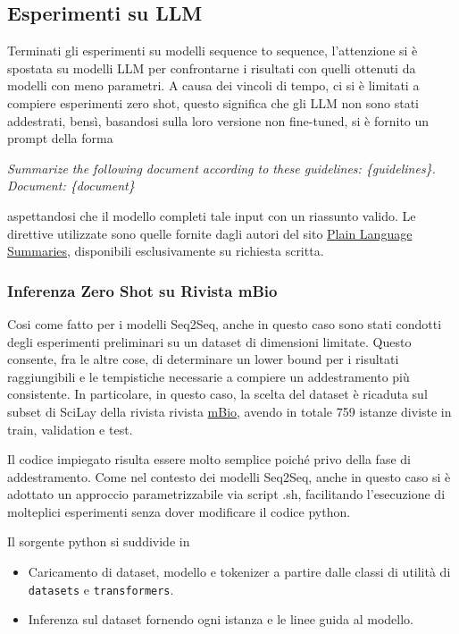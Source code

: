 \documentclass[12pt,a4paper,twoside,openright]{book}
\begin{document}
\subsection{Esperimenti su LLM}
Terminati gli esperimenti su modelli sequence to sequence, l'attenzione si è spostata su modelli LLM per confrontarne i risultati con quelli ottenuti da modelli con meno parametri. A causa dei vincoli di tempo, ci si è limitati a compiere esperimenti zero shot, questo significa che gli LLM non sono stati addestrati, bensì, basandosi sulla loro versione non fine-tuned, si è fornito un prompt della forma 
\begin{center}
    \emph{Summarize the following document according to these guidelines: \{guidelines\}. Document: \{document\}}
\end{center}
aspettandosi che il modello completi tale input con un riassunto valido. 
Le direttive utilizzate sono quelle fornite dagli autori del sito \href{https://www.plainlanguagesummaries.com/}{Plain Language Summaries}, disponibili esclusivamente su richiesta scritta.

\subsubsection{Inferenza Zero Shot su Rivista mBio}
Cosi come fatto per i modelli Seq2Seq, anche in questo caso sono stati condotti degli esperimenti preliminari su un dataset di dimensioni limitate. Questo consente, fra le altre cose, di determinare un lower bound per i risultati raggiungibili e le tempistiche necessarie a compiere un addestramento più consistente. 
In particolare, in questo caso, la scelta del dataset è ricaduta sul subset di SciLay della rivista rivista \href{https://journals.asm.org/journal/mbio}{mBio}, avendo in totale 759 istanze diviste in train, validation e test.

Il codice impiegato risulta essere molto semplice poiché privo della fase di addestramento.
Come nel contesto dei modelli Seq2Seq, anche in questo caso si è adottato un approccio parametrizzabile via script .sh, facilitando l'esecuzione di molteplici esperimenti senza dover modificare il codice python.

Il sorgente python si suddivide in 

\begin{itemize}
    \item Caricamento di dataset, modello e tokenizer a partire dalle classi di utilità di \texttt{datasets} e \texttt{transformers}.
    \item Inferenza sul dataset fornendo ogni istanza e le linee guida al modello.
\end{itemize}
\end{document}
